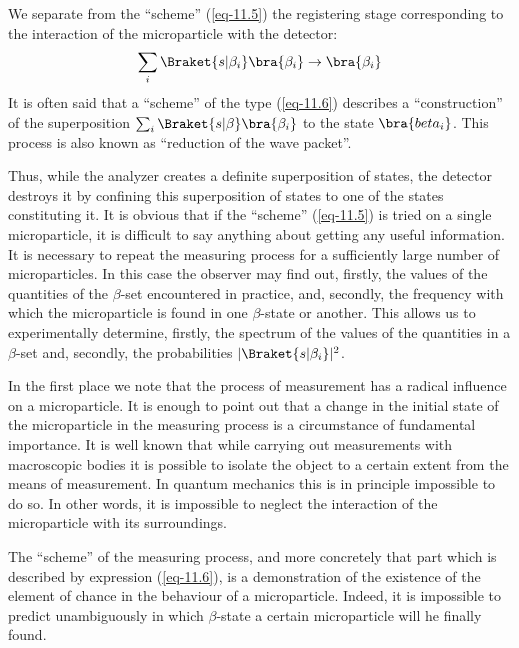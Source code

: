 \documentclass[a4paper,sfsidenotes,colorlinks=true]{tufte-book}
\numberwithin{equation}{section}
\numberwithin{figure}{section}
\begin{document}
We separate from the ``scheme'' (\ref{eq-11.5}) the registering stage
corresponding to the interaction of the microparticle with the
detector:
\begin{equation}
\sum_{i} \Braket{s|\beta_{i}} \bra{\beta_{i}} \to \bra{\beta_{i}}
\label{eq-11.6}
\end{equation}
It is often said that a ``scheme'' of the type (\ref{eq-11.6}) describes a
``construction'' of the superposition $\sum_{i} \Braket{s|\beta_{}}
\bra{\beta_{i}}$ to the state $\bra{beta_{i}}$. This process is also known as ``reduction of the wave packet''.

Thus, while the analyzer creates a definite superposition of states,
the detector destroys it by confining this superposition of states to
one of the states constituting it. It is obvious that if the
``scheme'' (\ref{eq-11.5}) is tried on a single microparticle, it is
difficult to say anything about getting any useful information. It is
necessary to repeat the measuring process for a sufficiently large
number of microparticles. In this case the observer may find out,
firstly, the values of the quantities of the $\beta$-set encountered
in practice, and, secondly, the frequency with which the microparticle
is found in one $\beta$-state or another. This allows us to
experimentally determine, firstly, the spectrum of the values of the
quantities in a $\beta$-set and, secondly, the probabilities $| \Braket{s|\beta_{i}} |^{2}$.


In the first place we note that the process of measurement has
a radical influence on a microparticle. It is enough to point out that
a change in the initial state of the microparticle in the measuring
process is a circumstance of fundamental importance. It is well known
that while carrying out measurements with macroscopic bodies it is
possible to isolate the object to a certain extent from the means of
measurement. In quantum mechanics this is in principle impossible to
do so. In other words, it is impossible to neglect the interaction of
the microparticle with its surroundings.


The ``scheme'' of the measuring process, and more concretely that part which is described by expression (\ref{eq-11.6}), is a demonstration of the existence of the element of chance in the behaviour of a microparticle. Indeed, it is impossible to predict unambiguously in which $\beta$-state a certain microparticle will he finally found.
\end{document}

